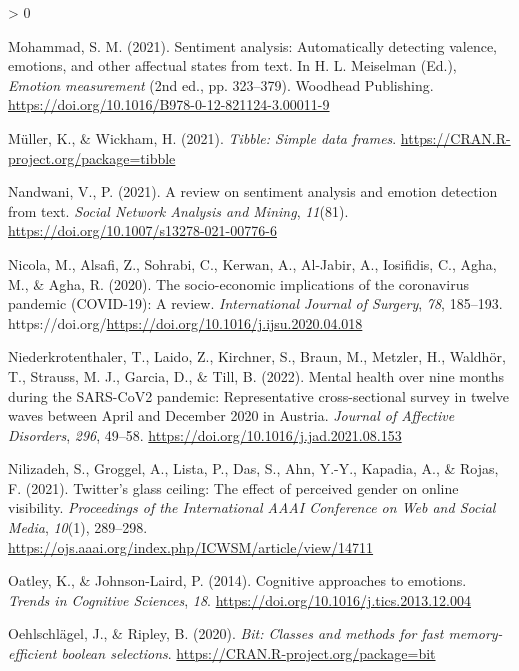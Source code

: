 \documentclass[
  english,
  jou,floatsintext]{apa7}
\newlength{\cslhangindent}
\newenvironment{CSLReferences}[2] %
 {%
  \setlength{\parindent}{0pt}
  \ifodd #1 \everypar{\setlength{\hangindent}{\cslhangindent}}\ignorespaces\fi
  \ifnum #2 > 0
  \setlength{\parskip}{#2\baselineskip}
  \fi
 }%
 {}
\begin{document}
\begin{CSLReferences}{1}{0}
\leavevmode\hypertarget{ref-MOHAMMAD2021323}{}%
Mohammad, S. M. (2021). Sentiment analysis: Automatically detecting valence, emotions, and other affectual states from text. In H. L. Meiselman (Ed.), \emph{Emotion measurement} (2nd ed., pp. 323--379). Woodhead Publishing. \url{https://doi.org/10.1016/B978-0-12-821124-3.00011-9}

\leavevmode\hypertarget{ref-R-tibble}{}%
Müller, K., \& Wickham, H. (2021). \emph{Tibble: Simple data frames}. \url{https://CRAN.R-project.org/package=tibble}

\leavevmode\hypertarget{ref-Nandwani2021}{}%
Nandwani, V., P. (2021). A review on sentiment analysis and emotion detection from text. \emph{Social Network Analysis and Mining}, \emph{11}(81). \url{https://doi.org/10.1007/s13278-021-00776-6}

\leavevmode\hypertarget{ref-Nicola2020}{}%
Nicola, M., Alsafi, Z., Sohrabi, C., Kerwan, A., Al-Jabir, A., Iosifidis, C., Agha, M., \& Agha, R. (2020). The socio-economic implications of the coronavirus pandemic (COVID-19): A review. \emph{International Journal of Surgery}, \emph{78}, 185--193. https://doi.org/\url{https://doi.org/10.1016/j.ijsu.2020.04.018}

\leavevmode\hypertarget{ref-NIEDERKROTENTHALER202249}{}%
Niederkrotenthaler, T., Laido, Z., Kirchner, S., Braun, M., Metzler, H., Waldhör, T., Strauss, M. J., Garcia, D., \& Till, B. (2022). Mental health over nine months during the SARS-CoV2 pandemic: Representative cross-sectional survey in twelve waves between {April} and {December} 2020 in {Austria}. \emph{Journal of Affective Disorders}, \emph{296}, 49--58. \url{https://doi.org/10.1016/j.jad.2021.08.153}

\leavevmode\hypertarget{ref-Nilizadeh2021}{}%
Nilizadeh, S., Groggel, A., Lista, P., Das, S., Ahn, Y.-Y., Kapadia, A., \& Rojas, F. (2021). Twitter's glass ceiling: The effect of perceived gender on online visibility. \emph{Proceedings of the International AAAI Conference on Web and Social Media}, \emph{10}(1), 289--298. \url{https://ojs.aaai.org/index.php/ICWSM/article/view/14711}

\leavevmode\hypertarget{ref-Oatley2014}{}%
Oatley, K., \& Johnson-Laird, P. (2014). Cognitive approaches to emotions. \emph{Trends in Cognitive Sciences}, \emph{18}. \url{https://doi.org/10.1016/j.tics.2013.12.004}

\leavevmode\hypertarget{ref-R-bit}{}%
Oehlschlägel, J., \& Ripley, B. (2020). \emph{Bit: Classes and methods for fast memory-efficient boolean selections}. \url{https://CRAN.R-project.org/package=bit}


\end{CSLReferences}
\end{document}
